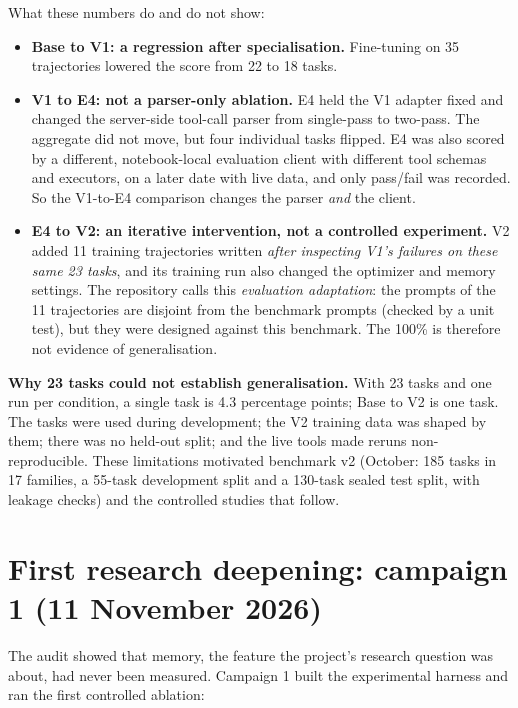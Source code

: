 \documentclass[10.5pt,a4paper,oneside]{report}
\begin{document}
What these numbers do and do not show:

\begin{itemize}
\item \textbf{Base to V1: a regression after specialisation.} Fine-tuning on 35 trajectories lowered the score from 22 to 18 tasks.
\item \textbf{V1 to E4: not a parser-only ablation.} E4 held the V1 adapter fixed and changed the server-side tool-call parser from single-pass to two-pass. The aggregate did not move, but four individual tasks flipped. E4 was also scored by a different, notebook-local evaluation client with different tool schemas and executors, on a later date with live data, and only pass/fail was recorded. So the V1-to-E4 comparison changes the parser \emph{and} the client.
\item \textbf{E4 to V2: an iterative intervention, not a controlled experiment.} V2 added 11 training trajectories written \emph{after inspecting V1's failures on these same 23 tasks}, and its training run also changed the optimizer and memory settings. The repository calls this \emph{evaluation adaptation}: the prompts of the 11 trajectories are disjoint from the benchmark prompts (checked by a unit test), but they were designed against this benchmark. The 100\% is therefore not evidence of generalisation.
\end{itemize}
\textbf{Why 23 tasks could not establish generalisation.} With 23 tasks and one run per condition, a single task is 4.3 percentage points; Base to V2 is one task. The tasks were used during development; the V2 training data was shaped by them; there was no held-out split; and the live tools made reruns non-reproducible. These limitations motivated benchmark v2 (October: 185 tasks in 17 families, a 55-task development split and a 130-task sealed test split, with leakage checks) and the controlled studies that follow.

\section{First research deepening: campaign 1 (11 November 2026)}
The audit showed that memory, the feature the project's research question was about, had never been measured. Campaign 1 built the experimental harness and ran the first controlled ablation:
\end{document}
